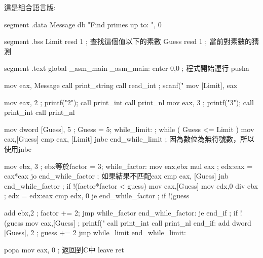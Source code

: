 這是組合語言版:
\begin{AsmCodeListing}[label=prime.asm]
segment .data
Message         db      "Find primes up to: ", 0

segment .bss
Limit           resd    1               ; 查找這個值以下的素數
Guess           resd    1               ; 當前對素數的猜測

segment .text
        global  _asm_main
_asm_main:
        enter   0,0               ; 程式開始運行
        pusha

        mov     eax, Message
        call    print_string
        call    read_int             ; scanf("%
        mov     [Limit], eax

        mov     eax, 2               ; printf("2\n");
        call    print_int
        call    print_nl
        mov     eax, 3               ; printf("3\n");
        call    print_int
        call    print_nl

        mov     dword [Guess], 5     ; Guess = 5;
while_limit:                         ; while ( Guess <= Limit )
        mov     eax,[Guess]
        cmp     eax, [Limit]
        jnbe    end_while_limit      ; 因為數位為無符號數，所以使用jnbe

        mov     ebx, 3               ; ebx等於factor = 3;
while_factor:
        mov     eax,ebx
        mul     eax                  ; edx:eax = eax*eax
        jo      end_while_factor     ; 如果結果不匹配eax
        cmp     eax, [Guess]
        jnb     end_while_factor     ; if !(factor*factor < guess)
        mov     eax,[Guess]
        mov     edx,0
        div     ebx                  ; edx = edx:eax %
        cmp     edx, 0
        je      end_while_factor     ; if !(guess %

        add     ebx,2                ; factor += 2;
        jmp     while_factor
end_while_factor:
        je      end_if               ; if !(guess %
        mov     eax,[Guess]          ; printf("%
        call    print_int
        call    print_nl
end_if:
        add     dword [Guess], 2     ; guess += 2
        jmp     while_limit
end_while_limit:

        popa
        mov     eax, 0            ; 返回到C中
        leave
        ret
\end{AsmCodeListing}

